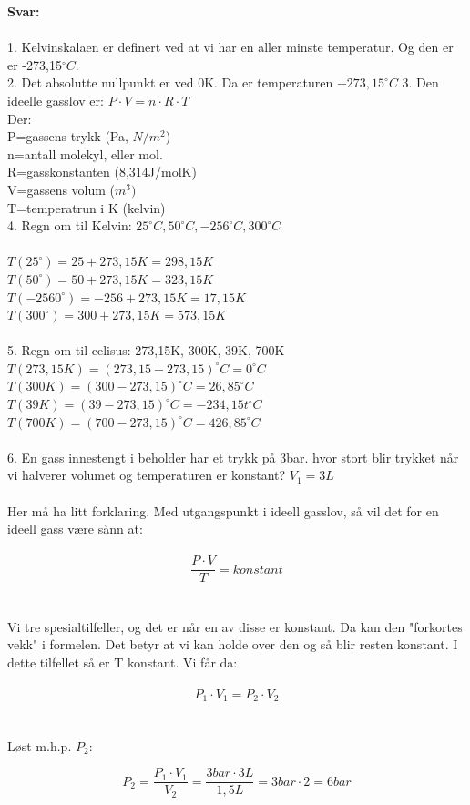 \documentclass[12pt,a4paper]{article}
\begin{document}
\noindent\textbf{Svar:}\\\\
1. Kelvinskalaen er definert ved at vi har en aller minste temperatur. Og den er er -273,15$^\circ C$.\\
2. Det absolutte nullpunkt er ved 0K. Da er temperaturen $-273,15^\circ C$
3. Den ideelle gasslov er:  $P\cdot V=n\cdot R\cdot T$\\
Der:\\
P=gassens trykk (Pa, $N/m^2$)\\
n=antall molekyl, eller mol.\\
R=gasskonstanten (8,314J/molK)\\
V=gassens volum ($m^3)$\\
T=temperatrun i K (kelvin)\\
4.  Regn om til Kelvin:  $25 ^\circ C, 50^\circ C, -256^\circ C, 300^\circ C $\\\\
$T(25^\circ)=25+273,15K=298,15K$\\
$T(50^\circ)=50+273,15K=323,15K$\\
$T(-2560^\circ)=-256+273,15K=17,15K$
$T(300^\circ)=300+273,15K=573,15K$\\\\
5. Regn om til celisus: 273,15K, 300K, 39K, 700K\\
$T(273,15K)=(273,15-273,15)^\circ  C=0^\circ C$\\
$T(300K)=(300-273,15)^\circ  C=26,85^\circ C$\\
$T(39K)=(39-273,15)^\circ  C=-234,15t^\circ C$\\
$T(700K)=(700-273,15)^\circ  C=426,85^\circ C$\\\\
6. En gass innestengt i beholder har et trykk på 3bar.  hvor stort blir trykket når vi halverer volumet og temperaturen er konstant? $V_1=3L$\\\\
Her må ha litt forklaring. Med utgangspunkt i ideell gasslov, så vil det for en ideell gass være sånn at:\\\\
$$\frac{P\cdot V}{T}=konstant$$\\\\
Vi tre spesialtilfeller, og det er når en av disse er konstant.  Da kan den "forkortes vekk" i formelen.  Det betyr at vi kan holde over den og så blir resten konstant.  I dette tilfellet så er T konstant. Vi får da:\\\\
$$P_1\cdot V_1=P_2\cdot V_2$$\\\\
Løst m.h.p. $P_2$:

$$P_2=\frac{P_1\cdot V_1}{V_2}=\frac{3bar\cdot 3L}{1,5L}=3bar\cdot 2=6bar$$
\end{document}
